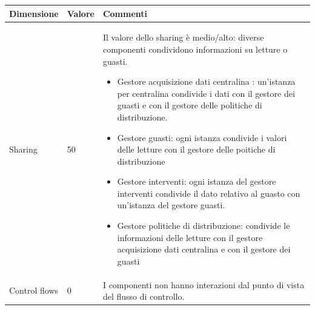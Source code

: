 \documentclass{beamer}
\begin{document}
\begin{frame}[allowframebreaks]
\begin{center}
\begin{table}
{\begin{tabular}{|M{0.1\textwidth}|M{0.1\textwidth}|p{.6\textwidth}|}
						\hline
				\end{tabular}}
			\end{table}
		\end{center}
		\pagebreak
		\begin{center}
			\begin{table}
				\tiny
				\centering
				{\renewcommand{\arraystretch}{1.2}
					\begin{tabular}{|M{0.1\textwidth}|M{0.1\textwidth}|p{.6\textwidth}|}
						\hline
						Dimensione & Valore & Commenti \\
						\hline
						Sharing & 50 & Il valore dello sharing è medio/alto: diverse componenti condividono informazioni su letture o guasti.
						\begin{itemize}
							\item Gestore acquisizione dati centralina : un'istanza per centralina condivide i dati con il gestore dei guasti e con il gestore delle politiche di distribuzione.
							\item Gestore guasti: ogni istanza condivide i valori delle letture con il gestore delle poitiche di distribuzione 
							\item Gestore interventi: ogni istanza del gestore interventi condivide il dato relativo al guasto con un'istanza del gestore guasti.
							\item Gestore politiche di distribuzione: condivide le informazioni delle letture con il gestore acquisizione dati centralina e con il gestore dei guasti
						\end{itemize} \\
						Control flows  & 0 & I componenti non hanno interazioni dal punto di vista del flusso di controllo. \\
						\hline
				\end{tabular}}
			\end{table}
		\end{center}	
	\end{frame}
	
\end{document}
